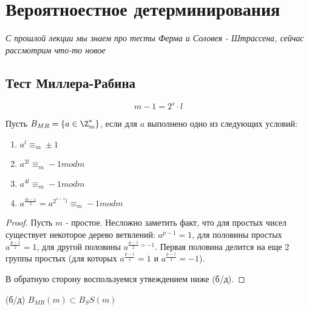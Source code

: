 
\section{Вероятноестное детерминирования}

\textit{С прошлой лекции мы знаем про тесты Ферма и Соловея - Штрассена, сейчас рассмотрим что-то новое}

\subsection{Тест Миллера-Рабина}

$$ m - 1 = 2^s \cdot l$$

Пусть $B_{MR} = \{a \in \Z^{*}_{m}\}$, если для $a$ выполнено одно из следующих условий:
\begin{enumerate}
  \item $a^l \equiv_m \pm 1$
  \item $a^{2l} \equiv_m -1 mod m$
  \item $a^{4l} \equiv_m -1 mod m$
  \item  $a^{\frac{m - 1}{2}} = a^{2^{s-1} l} \equiv_m -1 mod m$
\end{enumerate}

\begin{proof}
  Пусть $m$ - простое. Несложно заметить факт, что для простых чисел существует некоторое дерево ветвлений: $a^{p - 1} = 1$, для половины простых $a^{\frac{p-1}{2}} = 1$, для другой половины $a^{\frac{p-1}{2} = -1}$. Первая половина делится на еще 2 группы простых (для которых $a^{\frac{p-1}{4}} = 1$ и $a^{\frac{p-1}{4}} = -1$). 

  В обратную сторону воспользуемся утвеждением ниже (б/д).
\end{proof}

\begin{proposition}{(б/д)}
  $B_{MR}(m) \subset B_SS(m)$
\end{proposition}

